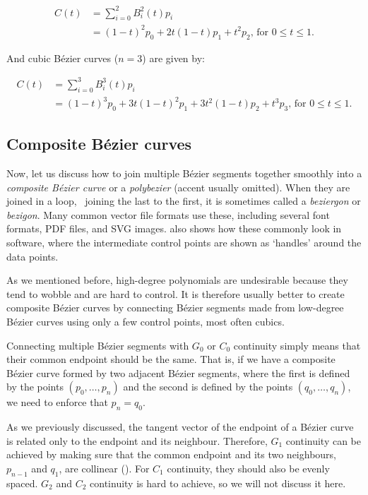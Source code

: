 \begin{align}
\label{eq:bezier2}
C(t) &= \sum_{i=0}^2 B^2_i(t) p_i \nonumber \\
&= (1-t)^2 p_0 + 2 t (1-t) p_1 + t^2 p_2\text{, for }0 \leq t \leq 1.
\end{align}

And cubic B\'ezier curves (\(n = 3\)) are given by:

\begin{align}
\label{eq:bezier3}
C(t) &= \sum_{i=0}^3 B^3_i(t) p_i \nonumber \\
&= (1-t)^3 p_0 + 3 t (1-t)^2 p_1 + 3 t^2 (1-t) p_2 + t^3 p_3\text{, for }0 \leq t \leq 1.
\end{align}

\subsection{Composite B\'ezier curves}

Now, let us discuss how to join multiple B\'ezier segments together smoothly into a \emph{composite B\'ezier curve} or a \emph{polybezier} (accent usually omitted).
When they are joined in a loop, \ie\ joining the last to the first, it is sometimes called a \emph{beziergon} or \emph{bezigon}.
Many common vector file formats use these, including several font formats, PDF files, and SVG images.
 also shows how these commonly look in software, where the intermediate control points are shown as `handles' around the data points.

As we mentioned before, high-degree polynomials are undesirable because they tend to wobble and are hard to control.
It is therefore usually better to create composite B\'ezier curves by connecting B\'ezier segments made from low-degree B\'ezier curves using only a few control points, most often cubics.

Connecting multiple B\'ezier segments with \(G_0\) or \(C_0\) continuity simply means that their common endpoint should be the same.
That is, if we have a composite B\'ezier curve formed by two adjacent B\'ezier segments, where the first is defined by the points \((p_0, \ldots, p_n)\) and the second is defined by the points \((q_0, \ldots, q_n)\), we need to enforce that \(p_n = q_0\).

As we previously discussed, the tangent vector of the endpoint of a B\'ezier curve is related only to the endpoint and its neighbour.
Therefore, \(G_1\) continuity can be achieved by making sure that the common endpoint and its two neighbours, \ie\ \(p_{n-1}\) and \(q_1\), are collinear ().
For \(C_1\) continuity, they should also be evenly spaced.
\(G_2\) and \(C_2\) continuity is hard to achieve, so we will not discuss it here.

